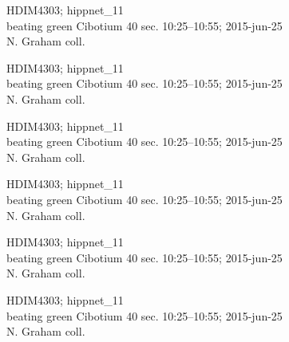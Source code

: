 \documentclass[2pt]{extarticle}
\begin{document}
\noindent
\parbox{0.16\textwidth}{\tiny \raggedright \rule[-0.3\baselineskip]{0pt}{10pt}HDIM4303; hippnet\_11\\ beating green Cibotium 40 sec. 10:25--10:55; 2015-jun-25\\ N. Graham coll.}
\parbox{0.16\textwidth}{\tiny \raggedright \rule[-0.3\baselineskip]{0pt}{10pt}HDIM4303; hippnet\_11\\ beating green Cibotium 40 sec. 10:25--10:55; 2015-jun-25\\ N. Graham coll.}
\parbox{0.16\textwidth}{\tiny \raggedright \rule[-0.3\baselineskip]{0pt}{10pt}HDIM4303; hippnet\_11\\ beating green Cibotium 40 sec. 10:25--10:55; 2015-jun-25\\ N. Graham coll.}
\parbox{0.16\textwidth}{\tiny \raggedright \rule[-0.3\baselineskip]{0pt}{10pt}HDIM4303; hippnet\_11\\ beating green Cibotium 40 sec. 10:25--10:55; 2015-jun-25\\ N. Graham coll.}
\parbox{0.16\textwidth}{\tiny \raggedright \rule[-0.3\baselineskip]{0pt}{10pt}HDIM4303; hippnet\_11\\ beating green Cibotium 40 sec. 10:25--10:55; 2015-jun-25\\ N. Graham coll.}
\parbox{0.16\textwidth}{\tiny \raggedright \rule[-0.3\baselineskip]{0pt}{10pt}HDIM4303; hippnet\_11\\ beating green Cibotium 40 sec. 10:25--10:55; 2015-jun-25\\ N. Graham coll.} \\ 
\vspace{0.001in} 
\end{document}
